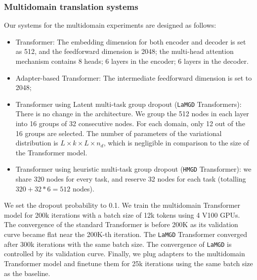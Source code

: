 \documentclass[11pt]{article}
\newcommand{\fyDone}[1]{\done[FY]\Todo[FY:]{\textcolor{orange}{#1}}}
\newcommand{\system}[1]{\texttt{{#1}}}
\begin{document}
\subsubsection{Multidomain translation systems}
Our systems for the multidomain experiments are designed as follows:
\begin{itemize}
\item Transformer: The embedding dimension for both encoder and decoder is set as 512, and the feedforward dimension is 2048; the multi-head attention mechanism contains 8 heads; 6 layers in the encoder; 6 layers in the decoder.\fyDone{How many layers}
\item Adapter-based Transformer: The intermediate feedforward dimension is set to 2048;%
\item Transformer using Latent multi-task group dropout (\system{LaMGD} Transformers):\fyDone{Explain acronym} There is no change in the architecture. We group the 512 nodes in each layer into 16 groups of 32 consecutive nodes. For each domain, only 12 out of the 16 groups are selected. The number of parameters of the variational distribution is $L\times k \times L \times n_d$, which is negligible in comparison to the size of the Transformer model.
\item Transformer using heuristic multi-task group dropout (\system{HMGD} Transformer): we share 320 nodes for every task, and reserve 32 nodes for each task (totalling $320 + 32*6 = 512$ nodes).
\end{itemize}

We set the dropout probability to 0.1. We train the multidomain Transformer model for 200k iterations with a batch size of 12k tokens using 4 V100 GPUs. The convergence of the standard Transformer is before 200K as its validation curve became flat near the 200K-th iteration. The \system{LaMGD} Transformer converged after 300k iterations with the same batch size. The convergence of \system{LaMGD} is controlled by its validation curve. Finally, we plug adapters to the multidomain Transformer model and finetune them for 25k iterations using the same batch size as the baseline.
\end{document}
